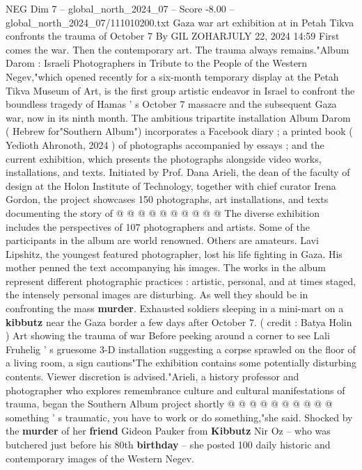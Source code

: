 \begin{textsample}{NEG Dim 7 – global\_north\_2024\_07 – Score -8.00 – global\_north\_2024\_07/111010200.txt}  \label{ex:f7_neg_117}
Gaza war art exhibition at in Petah Tikva confronts the trauma of October 7 By GIL ZOHARJULY 22, 2024 14:59 First comes the war.
Then the contemporary art.
The trauma always remains."Album Darom : Israeli Photographers in Tribute to the People of the Western Negev,"which opened recently for a six-month temporary display at the Petah Tikva Museum of Art, is the first group artistic endeavor in Israel to confront the boundless tragedy of Hamas ' s October 7 massacre and the subsequent Gaza war, now in its ninth month.
The ambitious tripartite installation Album Darom ( Hebrew for"Southern Album") incorporates a Facebook diary ; a printed book ( Yedioth Ahronoth, 2024 ) of photographs accompanied by essays ; and the current exhibition, which presents the photographs alongside video works, installations, and texts.
Initiated by Prof.
Dana Arieli, the dean of the faculty of design at the Holon Institute of Technology, together with chief curator Irena Gordon, the project showcases 150 photographs, art installations, and texts documenting the story of @ @ @ @ @ @ @ @ @ @ The diverse exhibition includes the perspectives of 107 photographers and artists.
Some of the participants in the album are world renowned.
Others are amateurs.
Lavi Lipshitz, the youngest featured photographer, lost his life fighting in Gaza.
His mother penned the text accompanying his images.
The works in the album represent different photographic practices : artistic, personal, and at times staged, the intensely personal images are disturbing.
As well they should be in confronting the mass \textbf{murder}.
Exhausted soldiers sleeping in a mini-mart on a \textbf{kibbutz} near the Gaza border a few days after October 7. ( credit : Batya Holin ) Art showing the trauma of war Before peeking around a corner to see Lali Fruhelig ' s gruesome 3-D installation suggesting a corpse sprawled on the floor of a living room, a sign cautions"The exhibition contains some potentially disturbing contents.
Viewer discretion is advised."Arieli, a history professor and photographer who explores remembrance culture and cultural manifestations of trauma, began the Southern Album project shortly @ @ @ @ @ @ @ @ @ @ something ' s traumatic, you have to work or do something,"she said.
Shocked by the \textbf{murder} of her \textbf{friend} Gideon Pauker from \textbf{Kibbutz} Nir Oz -- who was butchered just before his 80th \textbf{birthday} -- she posted 100 daily historic and contemporary images of the Western Negev.

\end{textsample}
